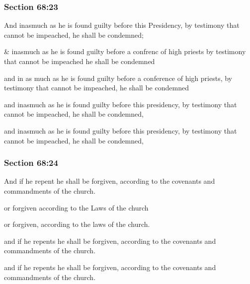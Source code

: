	\subsubsection{Section 68:23} %
		\label{DC68-23}

		And inasmuch as he is found guilty before this Presidency, by testimony that cannot be impeached, he shall be condemned;

		\begin{framed}
		\scriptsize
			\begin{compactdesc}
				\item[JSP] \& inasmuch as he is found guilty before a confrenc of high priests by testimony that cannot be impeached he shall be condemned
				\item[EMS] and in as much as he is found guilty before a conference of high priests, by testimony that cannot be impeached, he shall be condemned
				\item[EMS-R] and inasmuch as he is found guilty before this presidency, by testimony that cannot be impeached, he shall be condemned, 
				\item[DC 1835] and inasmuch as he is found guilty before this presidency, by testimony that cannot be impeached, he shall be condemned,
			\end{compactdesc}
		\end{framed}

	\subsubsection{Section 68:24} %
		\label{DC68-24}

		And if he repent he shall be forgiven, according to the covenants and commandments of the church.

		\begin{framed}
		\scriptsize
			\begin{compactdesc}
				\item[JSP] or forgiven according to the Laws of the church
				\item[EMS] or forgiven, according to the laws of the church.
				\item[EMS-R] and if he repents he shall be forgiven, according to the covenants and commandments of the church.
				\item[DC 1835] and if he repents he shall be forgiven, according to the covenants and commandments of the church.
			\end{compactdesc}
		\end{framed}

